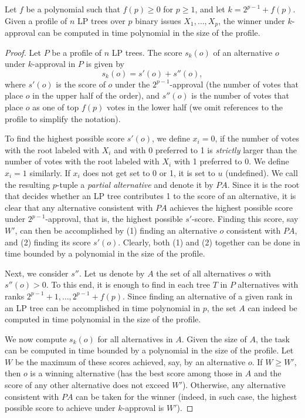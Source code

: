 \begin{thm}
\label{thm1}
Let $f$ be a polynomial such that $f(p)\geq 0$ for $p\geq 1$, and let
$k=2^{p-1}+f(p)$. Given 
a profile of $n$ LP trees over $p$ binary issues $X_1,\ldots,X_p$, the 
winner under $k$-approval can be computed in time polynomial in the
size of the profile.
\end{thm}
\begin{proof}
Let $P$ be a profile of $n$ LP trees. The score $s_k(o)$ of an alternative
$o$ under $k$-approval in $P$ is given by 
\[
s_k(o) = s'(o)+s''(o),
\]
where $s'(o)$ is the score of $o$ under the $2^{p-1}$-approval (the number
of votes that place $o$ in the upper half of the order), and $s''(o)$ is the
number of votes that place $o$ as one of top $f(p)$ votes in the lower 
half (we omit references to the profile to simplify the notation).

To find the highest possible score $s'(o)$, we define $x_i=0$, if 
the number of votes with the root labeled with $X_i$ and with 0 preferred
to 1 is \emph{strictly} larger than the number of votes with the root 
labeled with $X_i$ with 1 preferred to 0. We define $x_i=1$ similarly.
If $x_i$ does not get set to 0 or 1, it is set to $u$ (undefined). We
call the resulting $p$-tuple a \emph{partial alternative} and denote 
it by $PA$. Since it is the root that decides whether an LP tree 
contributes 1 to the score of an alternative, it is clear that any 
alternative consistent with $PA$ achieves the highest possible 
score under $2^{p-1}$-approval, that is, the highest possible $s'$-score.  
Finding this score, say $W'$, can then be accomplished by (1) finding
an alternative $o$ consistent with $PA$, and (2) finding its score $s'(o)$.
Clearly, both (1) and (2) together can be done in time bounded by a polynomial 
in the size of the profile.

Next, we consider $s''$. Let us denote by $A$ the set of all alternatives 
$o$ with $s''(o)>0$. To this end, it is enough
to find in each tree $T$ in $P$ alternatives with ranks $2^{p-1}+1,
\ldots, 2^{p-1}+f(p)$. Since finding an alternative of a given rank in 
an LP tree can be accomplished in time polynomial in $p$, the set $A$ 
can indeed be computed in time polynomial in the size of the profile.

We now compute $s_k(o)$ for all alternatives in $A$. Given the size of
$A$, the task can be computed in time bounded by a polynomial in the size
of the profile. Let $W$ be the maximum of these scores achieved, say, by an
alternative $o$. If $W\geq W'$, then $o$ is a winning alternative (has 
the best score among those in $A$ and the score of any other alternative 
does not exceed $W'$). Otherwise, any alternative consistent with $PA$ 
can be taken for the winner (indeed, in such case, the highest possible 
score to achieve under $k$-approval is $W'$). 
\end{proof}


